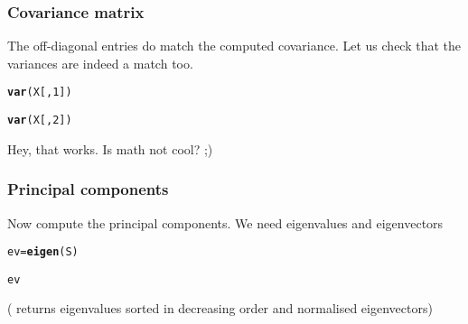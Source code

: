 \documentclass[aspectratio=169]{beamer}\usepackage[]{graphicx}\usepackage[]{xcolor}
\makeatletter
\newcommand{\hlnum}[1]{\textcolor[rgb]{0.686,0.059,0.569}{#1}}%
\newcommand{\hldef}[1]{\textcolor[rgb]{0.345,0.345,0.345}{#1}}%
\newcommand{\hlkwb}[1]{\textcolor[rgb]{0.69,0.353,0.396}{#1}}%
\newcommand{\hlkwd}[1]{\textcolor[rgb]{0.737,0.353,0.396}{\textbf{#1}}}%
\newenvironment{kframe}{%
 \def\at@end@of@kframe{}%
 \ifinner\ifhmode%
  \def\at@end@of@kframe{\end{minipage}}%
  \begin{minipage}{\columnwidth}%
 \fi\fi%
 \def\FrameCommand##1{\hskip\@totalleftmargin \hskip-\fboxsep
 \colorbox{shadecolor}{##1}\hskip-\fboxsep
     \hskip-\linewidth \hskip-\@totalleftmargin \hskip\columnwidth}%
 \MakeFramed {\advance\hsize-\width
   \@totalleftmargin\z@ \linewidth\hsize
   \@setminipage}}%
 {\par\unskip\endMakeFramed%
 \at@end@of@kframe}
\newenvironment{knitrout}{}{} %
\makeatother
\begin{document}
\begin{frame}[fragile]\frametitle{Covariance matrix}
The off-diagonal entries do match the computed covariance. Let us check that the variances are indeed a match too.


\begin{knitrout}
\color{fgcolor}\begin{kframe}
\begin{alltt}
\hlkwd{var}\hldef{(X[,}\hlnum{1}\hldef{])}
\end{alltt}


{\ttfamily\noindent\bfseries\color{errorcolor}{\#\# Error: object 'X' not found}}\begin{alltt}
\hlkwd{var}\hldef{(X[,}\hlnum{2}\hldef{])}
\end{alltt}


{\ttfamily\noindent\bfseries\color{errorcolor}{\#\# Error: object 'X' not found}}\end{kframe}
\end{knitrout}


Hey, that works. Is math not cool? ;)
\end{frame}


\begin{frame}[fragile]\frametitle{Principal components}
Now compute the principal components. We need eigenvalues and eigenvectors
\vfill
\begin{knitrout}
\color{fgcolor}\begin{kframe}
\begin{alltt}
\hldef{ev} \hlkwb{=} \hlkwd{eigen}\hldef{(S)}
\end{alltt}


{\ttfamily\noindent\bfseries\color{errorcolor}{\#\# Error: object 'S' not found}}\begin{alltt}
\hldef{ev}
\end{alltt}


{\ttfamily\noindent\bfseries\color{errorcolor}{\#\# Error: object 'ev' not found}}\end{kframe}
\end{knitrout}
\vfill
( returns eigenvalues sorted in decreasing order and normalised eigenvectors)
\end{frame}
\end{document}
